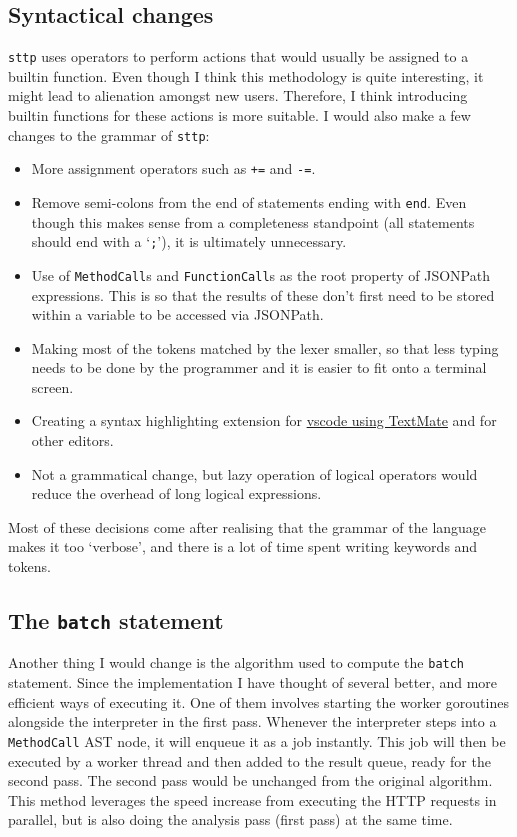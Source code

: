 \cprotect\subsection{Syntactical changes}

\verb|sttp| uses operators to perform actions that would usually be assigned to a builtin function. Even though I think this methodology is quite interesting, it might lead to alienation amongst new users. Therefore, I think introducing builtin functions for these actions is more suitable. I would also make a few changes to the grammar of \verb|sttp|:

\begin{itemize}
    \item More assignment operators such as \verb|+=| and \verb|-=|.
    \item Remove semi-colons from the end of statements ending with \verb|end|. Even though this makes sense from a completeness standpoint (all statements should end with a `\verb|;|'), it is ultimately unnecessary.
    \item Use of \verb|MethodCall|s and \verb|FunctionCall|s as the root property of JSONPath expressions. This is so that the results of these don't first need to be stored within a variable to be accessed via JSONPath.
    \item Making most of the tokens matched by the lexer smaller, so that less typing needs to be done by the programmer and it is easier to fit onto a terminal screen.
    \item Creating a syntax highlighting extension for \href{https://code.visualstudio.com/api/language-extensions/syntax-highlight-guide}{vscode using TextMate} and for other editors.
    \item Not a grammatical change, but lazy operation of logical operators would reduce the overhead of long logical expressions.
\end{itemize}

Most of these decisions come after realising that the grammar of the language makes it too `verbose', and there is a lot of time spent writing keywords and tokens.

\cprotect\subsection{The \verb|batch| statement}

Another thing I would change is the algorithm used to compute the \verb|batch| statement. Since the implementation I have thought of several better, and more efficient ways of executing it. One of them involves starting the worker goroutines alongside the interpreter in the first pass. Whenever the interpreter steps into a \verb|MethodCall| AST node, it will enqueue it as a job instantly. This job will then be executed by a worker thread and then added to the result queue, ready for the second pass. The second pass would be unchanged from the original algorithm. This method leverages the speed increase from executing the HTTP requests in parallel, but is also doing the analysis pass (first pass) at the same time.

